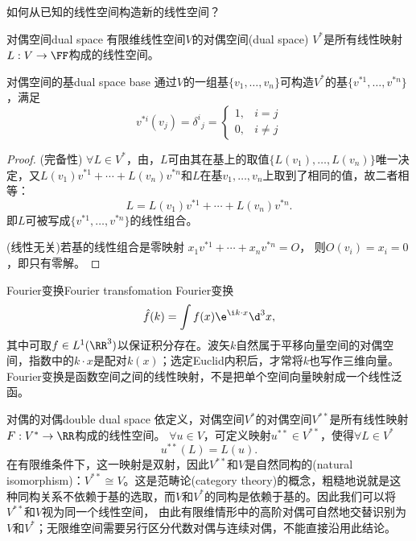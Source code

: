 如何从已知的线性空间构造新的线性空间？
\begin{definition}{对偶空间}{dual space}
	有限维线性空间$V$的对偶空间(dual space) $V^\ast$是所有线性映射$L:V\to\FF$构成的线性空间。
\end{definition}
\begin{theorem}{对偶空间的基}{dual space base}
	通过$V$的一组基$\{v_1,\ldots,v_n\}$可构造$V^\ast$的基$\{v^{\ast 1},\ldots,v^{\ast n}\}$，满足
	\begin{equation}
		v^{\ast i}(v_j)=\delta^i{}_j=
		\begin{cases}
			1,&i=j\\0,&i\neq j
		\end{cases}
	\end{equation}
\end{theorem}
\begin{proof}
	(完备性) $\forall L\in V^\ast$，由，$L$可由其在基上的取值$\{L(v_1),\ldots,L(v_n)\}$唯一决定，又$L(v_1)v^{\ast 1}+\cdots+L(v_n)v^{\ast n}$和$L$在基$v_1,\ldots,v_n$上取到了相同的值，故二者相等：
	\[
		L=L(v_1)v^{\ast 1}+\cdots+L(v_n)v^{\ast n}.
	\]
	即$L$可被写成$\{v^{\ast 1},\ldots,v^{\ast n}\}$的线性组合。

	(线性无关)若基的线性组合是零映射
	$x_1v^{\ast 1}+\cdots+x_nv^{\ast n}=O$，
	则$O(v_i)=x_i=0$，即只有零解。
\end{proof}
\begin{example}{Fourier变换}{Fourier transfomation}
	Fourier变换
	\[
		\hat f(k)=\int f(x)\e^{\i k\cdot x}\d^3x,
	\]
	其中可取$f\in L^1(\RR^3)$以保证积分存在。波矢$k$自然属于平移向量空间的对偶空间，指数中的$k\cdot x$是配对$k(x)$；选定Euclid内积后，才常将$k$也写作三维向量。Fourier变换是函数空间之间的线性映射，不是把单个空间向量映射成一个线性泛函。
\end{example}
\begin{example}{对偶的对偶}{double dual space}
	依定义，对偶空间$V^\ast$的对偶空间$V^{\ast\ast}$是所有线性映射$F:V^\ast\to\RR$构成的线性空间。%
	$\forall u\in V$，可定义映射$u^{\ast\ast}\in V^{\ast\ast}$，使得$\forall L\in V^\ast$
	\begin{equation}
		u^{\ast\ast}(L)=L(u).
	\end{equation}
	在有限维条件下，这一映射是双射，因此$V^{\ast\ast}$和$V$是自然同构的(natural isomorphism)：$V^{\ast\ast}\cong V$。这是范畴论(category theory)的概念，粗糙地说就是这种同构关系不依赖于基的选取，而$V$和$V^\ast$的同构是依赖于基的。因此我们可以将$V^{\ast\ast}$和$V$视为同一个线性空间，
	由此有限维情形中的高阶对偶可自然地交替识别为$V$和$V^\ast$；无限维空间需要另行区分代数对偶与连续对偶，不能直接沿用此结论。
\end{example}
